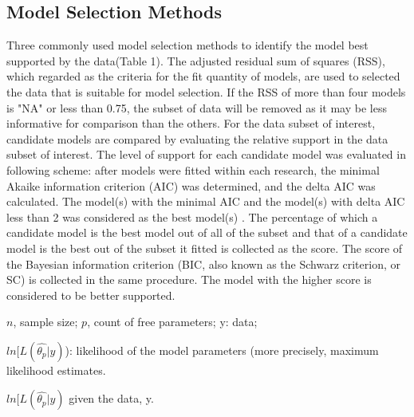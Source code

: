 \documentclass[a4paper,11pt]{article}
\theoremstyle{definition}
\begin{document}
\subsection{Model Selection Methods}
Three commonly used model selection methods to identify the model best supported by the data(Table 1). The adjusted residual sum of squares (RSS), which regarded as the criteria for the fit quantity of models, are used to selected the data that is suitable for model selection. If the RSS of more than four models is "NA" or less than 0.75, the subset of data will be removed as it may be less informative for comparison than the others. For the data subset of interest, candidate models are compared by evaluating the relative support in the data subset of interest.
The level of support for each candidate model was evaluated in following scheme: after models were fitted within each research, the minimal Akaike information criterion (AIC) was determined, and the delta AIC was calculated. The model(s) with the minimal AIC and the model(s) with delta AIC less than 2 was considered as the best model(s) \citep{burnham2004multimodel}. The percentage of which a candidate model is the best model out of all of the subset and that of a candidate model is the best out of the subset it fitted is collected as the score. The score of the Bayesian information criterion (BIC, also known as the Schwarz criterion, or SC) is collected in the same procedure. The model with the higher score is considered to be better supported.\\
\begin{center}
\begin{table}[]
\caption {Used commonly model selection methods}
\begin{threeparttable}
 \begin{tablenotes}
        \footnotesize
        \item[] $n$, sample size; $p$, count of free parameters; y: data; 
        \item[] $ln[L(\hat{\theta_p}|y)$): likelihood of the model parameters (more precisely, maximum likelihood estimates.
        \item[] $ln[L(\hat{\theta_p}|y)$ given the data, y. 
      \end{tablenotes}
    \end{threeparttable}
\end{table}
\end{center}
\end{document}
